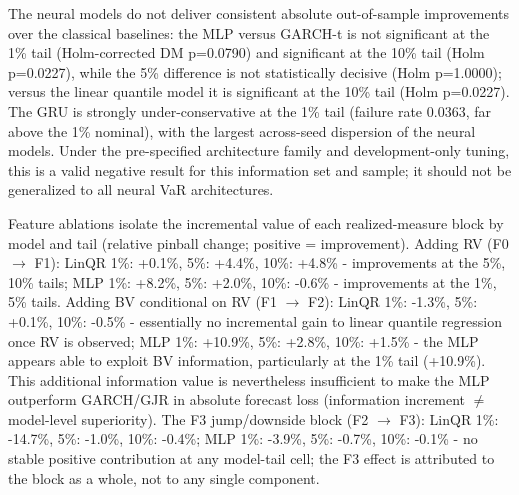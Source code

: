 \documentclass[11pt]{article}
\begin{document}
The neural models do not deliver consistent absolute out-of-sample improvements over the classical baselines: the MLP versus GARCH-t is not significant at the 1\% tail (Holm-corrected DM p=0.0790) and significant at the 10\% tail (Holm p=0.0227), while the 5\% difference is not statistically decisive (Holm p=1.0000); versus the linear quantile model it is significant at the 10\% tail (Holm p=0.0227). The GRU is strongly under-conservative at the 1\% tail (failure rate 0.0363, far above the 1\% nominal), with the largest across-seed dispersion of the neural models. Under the pre-specified architecture family and development-only tuning, this is a valid negative result for this information set and sample; it should not be generalized to all neural VaR architectures.

Feature ablations isolate the incremental value of each realized-measure block by model and tail (relative pinball change; positive = improvement). Adding RV (F0 $\rightarrow$ F1): LinQR 1\%: +0.1\%, 5\%: +4.4\%, 10\%: +4.8\% - improvements at the 5\%, 10\% tails; MLP 1\%: +8.2\%, 5\%: +2.0\%, 10\%: -0.6\% - improvements at the 1\%, 5\% tails. Adding BV conditional on RV (F1 $\rightarrow$ F2): LinQR 1\%: -1.3\%, 5\%: +0.1\%, 10\%: -0.5\% - essentially no incremental gain to linear quantile regression once RV is observed; MLP 1\%: +10.9\%, 5\%: +2.8\%, 10\%: +1.5\% - the MLP appears able to exploit BV information, particularly at the 1\% tail (+10.9\%). This additional information value is nevertheless insufficient to make the MLP outperform GARCH/GJR in absolute forecast loss (information increment $\neq$ model-level superiority). The F3 jump/downside block (F2 $\rightarrow$ F3): LinQR 1\%: -14.7\%, 5\%: -1.0\%, 10\%: -0.4\%; MLP 1\%: -3.9\%, 5\%: -0.7\%, 10\%: -0.1\% - no stable positive contribution at any model-tail cell; the F3 effect is attributed to the block as a whole, not to any single component.
\end{document}
